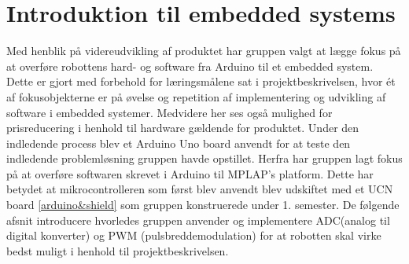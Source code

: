 \section{Introduktion til embedded systems}
Med henblik på videreudvikling af produktet har gruppen valgt at lægge fokus på at overføre robottens hard- og software fra Arduino til et embedded system. Dette er gjort med forbehold for læringsmålene sat i projektbeskrivelsen, hvor ét af fokusobjekterne er på øvelse og repetition af implementering og udvikling af software i embedded systemer. 
\newline 
Medvidere her ses også mulighed for prisreducering i henhold til hardware gældende for produktet. Under den indledende process blev et Arduino Uno board anvendt for at teste den indledende problemløsning gruppen havde opstillet. 
\newline
Herfra har gruppen lagt fokus på at overføre softwaren skrevet i Arduino til MPLAP's platform. Dette har betydet at mikrocontrolleren som først blev anvendt blev udskiftet med et UCN board \ref{arduino&shield} som gruppen konstruerede under 1. semester. 
\newline
\newline
De følgende afsnit introducere hvorledes gruppen anvender og implementere ADC(analog til digital konverter) og PWM (pulsbreddemodulation) for at robotten skal virke bedst muligt i henhold til projektbeskrivelsen.  
   





